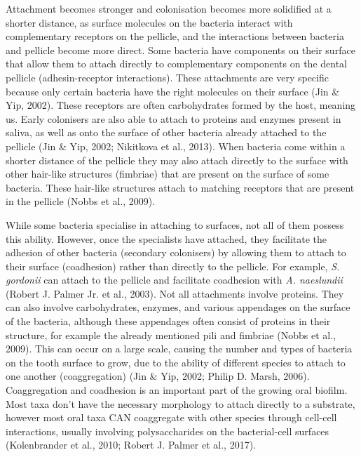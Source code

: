 \documentclass[
  letterpaper,
]{book}
\begin{document}
Attachment becomes stronger and colonisation becomes more solidified at
a shorter distance, as surface molecules on the bacteria interact with
complementary receptors on the pellicle, and the interactions between
bacteria and pellicle become more direct. Some bacteria have components
on their surface that allow them to attach directly to complementary
components on the dental pellicle (adhesin-receptor interactions). These
attachments are very specific because only certain bacteria have the
right molecules on their surface (Jin \& Yip, 2002). These receptors are
often carbohydrates formed by the host, meaning us. Early colonisers are
also able to attach to proteins and enzymes present in saliva, as well
as onto the surface of other bacteria already attached to the pellicle
(Jin \& Yip, 2002; Nikitkova et al., 2013). When bacteria come within a
shorter distance of the pellicle they may also attach directly to the
surface with other hair-like structures (fimbriae) that are present on
the surface of some bacteria. These hair-like structures attach to
matching receptors that are present in the pellicle (Nobbs et al.,
2009).

While some bacteria specialise in attaching to surfaces, not all of them
possess this ability. However, once the specialists have attached, they
facilitate the adhesion of other bacteria (secondary colonisers) by
allowing them to attach to their surface (coadhesion) rather than
directly to the pellicle. For example, \emph{S. gordonii} can attach to
the pellicle and facilitate coadhesion with \emph{A. naeslundii} (Robert
J. Palmer Jr. et al., 2003). Not all attachments involve proteins. They
can also involve carbohydrates, enzymes, and various appendages on the
surface of the bacteria, although these appendages often consist of
proteins in their structure, for example the already mentioned pili and
fimbriae (Nobbs et al., 2009). This can occur on a large scale, causing
the number and types of bacteria on the tooth surface to grow, due to
the ability of different species to attach to one another
(coaggregation) (Jin \& Yip, 2002; Philip D. Marsh, 2006). Coaggregation
and coadhesion is an important part of the growing oral biofilm. Most
taxa don't have the necessary morphology to attach directly to a
substrate, however most oral taxa CAN coaggregate with other species
through cell-cell interactions, usually involving polysaccharides on the
bacterial-cell surfaces (Kolenbrander et al., 2010; Robert J. Palmer et
al., 2017).
\end{document}
